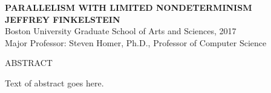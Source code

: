 \newenvironment{abstractpage}
  {\thispagestyle{plain}}
  {}

\begin{abstractpage}
  \begin{center}
    \textbf{\uppercase{Parallelism with limited nondeterminism}}\\
    \textbf{\uppercase{Jeffrey Finkelstein}}\\
    Boston University Graduate School of Arts and Sciences, 2017\\
    Major Professor: Steven Homer, Ph.D., Professor of Computer Science
  \end{center}
  \begin{center}
    ABSTRACT
  \end{center}
  Text of abstract goes here.
\end{abstractpage}
